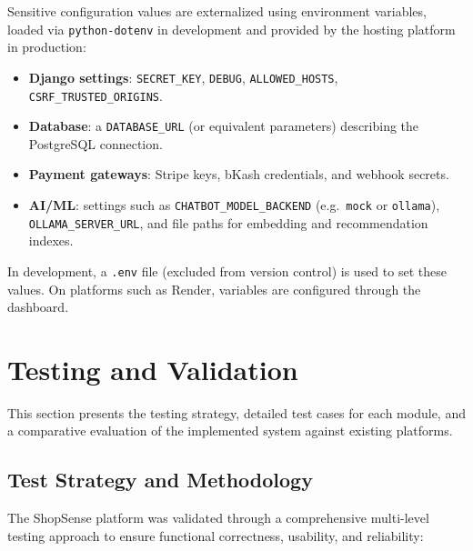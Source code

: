 Sensitive configuration values are externalized using environment variables, loaded via \texttt{python-dotenv} in development and provided by the hosting platform in production:

\begin{itemize}
  \item \textbf{Django settings}: \texttt{SECRET\_KEY}, \texttt{DEBUG}, \texttt{ALLOWED\_HOSTS}, \texttt{CSRF\_TRUSTED\_ORIGINS}.
  \item \textbf{Database}: a \texttt{DATABASE\_URL} (or equivalent parameters) describing the PostgreSQL connection.
  \item \textbf{Payment gateways}: Stripe keys, bKash credentials, and webhook secrets.
  \item \textbf{AI/ML}: settings such as \texttt{CHATBOT\_MODEL\_BACKEND} (e.g.\ \texttt{mock} or \texttt{ollama}), \\\texttt{OLLAMA\_SERVER\_URL}, and file paths for embedding and recommendation indexes.
\end{itemize}

In development, a \texttt{.env} file (excluded from version control) is used to set these values. On platforms such as Render, variables are configured through the dashboard.

\section{Testing and Validation}

This section presents the testing strategy, detailed test cases for each module, and a comparative evaluation of the implemented system against existing platforms.

\subsection{Test Strategy and Methodology}

The ShopSense platform was validated through a comprehensive multi-level testing approach to ensure functional correctness, usability, and reliability:

